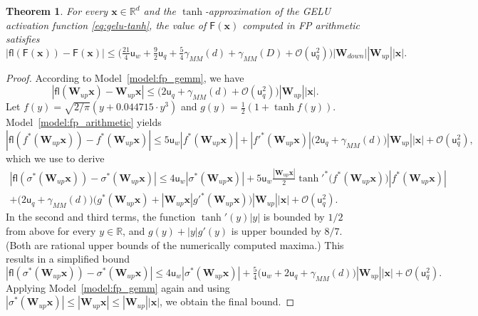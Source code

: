 \documentclass[namedate,webpdf,imanum]{ima-authoring-template}
\newcommand{\Real}{\mathbb{R}}
\newcommand{\Matrix}[1]{\mathbf{#1}}
\newcommand{\Layer}[1]{\mathsf{#1}}
\newcommand{\fl}[2][]{\mathsf{fl}#1( #2 #1)}
\newcommand{\uh}{\mathsf{u}}
\newcommand{\Oh}[2][]{\mathcal{O}#1( #2 #1)}
\newtheorem{theorem}{Theorem}[section]%
\numberwithin{equation}{section}
\begin{document}
\begin{theorem}
\label{theorem:rounding-ffn-gelu-tanh}
For every $\Matrix{x} \in \Real^d$ and the $\tanh$-approximation of the GELU activation function \eqref{eq:gelu-tanh}, the value of $\Layer{F}(\Matrix{x})$ computed in FP arithmetic satisfies
\begin{equation*}
    |\fl{\Layer{F}(\Matrix{x})} - \Layer{F}(\Matrix{x})| \leq \Big( \tfrac{21}{4} \uh_{w} + \tfrac{9}{2} \uh_{q} + \tfrac{5}{4} \gamma_{MM}(d) + \gamma_{MM}(D) + \Oh{\uh_{q}^2} \Big) |\Matrix{W}_{down}| |\Matrix{W}_{up}| |\Matrix{x}|.
\end{equation*}
\end{theorem}
\begin{proof}
According to Model~\ref{model:fp_gemm}, we have
\begin{equation*}
    |\fl{\Matrix{W}_{up} \Matrix{x}} - \Matrix{W}_{up} \Matrix{x}| \leq \Big( 2 \uh_{q} + \gamma_{MM}(d) + \Oh{\uh_{q}^2} \Big) |\Matrix{W}_{up}| |\Matrix{x}|.
\end{equation*}
Let $f(y) = \sqrt{2 / \pi} (y + 0.044715 \cdot y^3)$ and $g(y) = \tfrac{1}{2} (1 + \tanh f(y))$.
Model~\ref{model:fp_arithmetic} yields
\begin{equation*}
    |\fl{f^\ast(\Matrix{W}_{up} \Matrix{x})} - f^\ast(\Matrix{W}_{up} \Matrix{x})| \leq 5 \uh_{w} |f^\ast(\Matrix{W}_{up} \Matrix{x})| + |f'^\ast(\Matrix{W}_{up} \Matrix{x})| \Big( 2 \uh_{q} + \gamma_{MM}(d) \Big) |\Matrix{W}_{up}| |\Matrix{x}| + \Oh{\uh_{q}^2},
\end{equation*}
which we use to derive
\begin{multline*}
    |\fl{\sigma^\ast(\Matrix{W}_{up} \Matrix{x})} - \sigma^\ast(\Matrix{W}_{up} \Matrix{x})| \leq 4 \uh_{w} |\sigma^\ast(\Matrix{W}_{up} \Matrix{x})| + 5 \uh_{w} \frac{|\Matrix{W}_{up} \Matrix{x}|}{2} \tanh'^{\ast}\Big(f^\ast(\Matrix{W}_{up} \Matrix{x})\Big) |f^\ast(\Matrix{W}_{up} \Matrix{x})| \\
    + \Big( 2 \uh_{q} + \gamma_{MM}(d) \Big) \Big( g^\ast(\Matrix{W}_{up} \Matrix{x}) + |\Matrix{W}_{up} \Matrix{x}| g'^\ast(\Matrix{W}_{up} \Matrix{x}) \Big) |\Matrix{W}_{up}| |\Matrix{x}| + \Oh{\uh_{q}^2}.
\end{multline*}
In the second and third terms, the function $\tanh'(y) |y|$ is bounded by $1/2$ from above for every $y \in \Real$, and $g(y) + |y| g'(y)$ is upper bounded by $8/7$.
(Both are rational upper bounds of the numerically computed maxima.)
This results in a simplified bound
\begin{equation*}
    |\fl{\sigma^\ast(\Matrix{W}_{up} \Matrix{x})} - \sigma^\ast(\Matrix{W}_{up} \Matrix{x})| \leq 4 \uh_{w} |\sigma^\ast(\Matrix{W}_{up} \Matrix{x})| + \tfrac{5}{4} \Big( \uh_{w} + 2 \uh_{q} + \gamma_{MM}(d) \Big) |\Matrix{W}_{up}| |\Matrix{x}| + \Oh{\uh_{q}^2}.
\end{equation*}
Applying Model~\ref{model:fp_gemm} again and using $|\sigma^\ast(\Matrix{W}_{up} \Matrix{x})| \leq |\Matrix{W}_{up} \Matrix{x}| \leq |\Matrix{W}_{up}| |\Matrix{x}|$, we obtain the final bound.
\end{proof}
\end{document}
